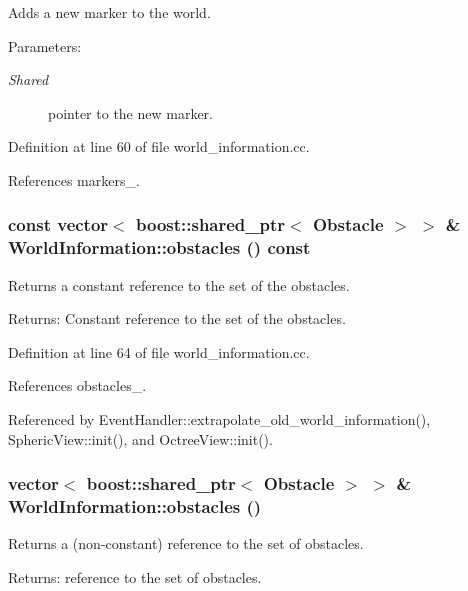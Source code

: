 Adds a new marker to the world. \begin{Desc}
\item[Parameters:]
\begin{description}
\item[{\em Shared}]pointer to the new marker. \end{description}
\end{Desc}


Definition at line 60 of file world\_\-information.cc.

References markers\_\-.\hypertarget{class_world_information_de0421ba8140ec32f9c6be1ced83658d}{
\subsubsection[obstacles]{\setlength{\rightskip}{0pt plus 5cm}const vector$<$ boost::shared\_\-ptr$<$ Obstacle $>$ $>$ \& WorldInformation::obstacles () const}}
\label{class_world_information_de0421ba8140ec32f9c6be1ced83658d}


Returns a constant reference to the set of the obstacles. \begin{Desc}
\item[Returns:]Constant reference to the set of the obstacles. \end{Desc}


Definition at line 64 of file world\_\-information.cc.

References obstacles\_\-.

Referenced by EventHandler::extrapolate\_\-old\_\-world\_\-information(), SphericView::init(), and OctreeView::init().\hypertarget{class_world_information_3493426dec99ed41f744a2778f8389c2}{
\subsubsection[obstacles]{\setlength{\rightskip}{0pt plus 5cm}vector$<$ boost::shared\_\-ptr$<$ Obstacle $>$ $>$ \& WorldInformation::obstacles ()}}
\label{class_world_information_3493426dec99ed41f744a2778f8389c2}


Returns a (non-constant) reference to the set of obstacles. \begin{Desc}
\item[Returns:]reference to the set of obstacles. \end{Desc}


